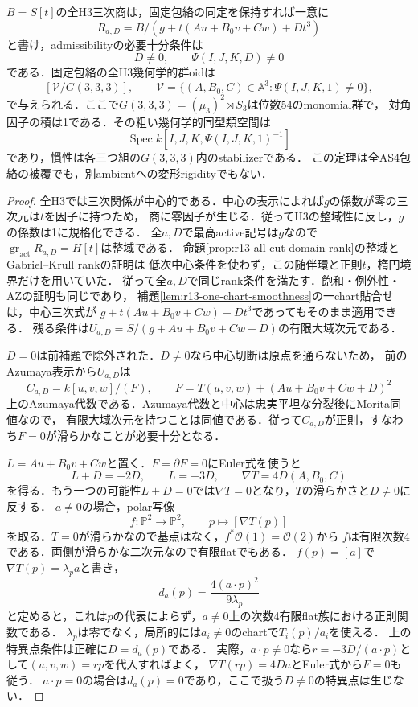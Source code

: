 \begin{theorem}
\label{thm:clifford-all-H3-cuts}
$B=S[t]$の全H3三次商は，固定包絡の同定を保持すれば一意に
\[
 R_{a,D}=B/(g+t(Au+B_0v+Cw)+Dt^3)
\]
と書け，admissibilityの必要十分条件は
\[
 D\ne0,\qquad \Psi(I,J,K,D)\ne0
\]
である．固定包絡の全H3幾何学的群oidは
\[
 [\mathcal V/G(3,3,3)],\qquad
 \mathcal V=\{(A,B_0,C)\in\mathbb A^3:\Psi(I,J,K,1)\ne0\},
\]
で与えられる．ここで$G(3,3,3)=(\mu_3)^2\rtimes S_3$は位数54のmonomial群で，
対角因子の積は1である．その粗い幾何学的同型類空間は
\[
 \operatorname{Spec}k[I,J,K,\Psi(I,J,K,1)^{-1}]
\]
であり，慣性は各三つ組の$G(3,3,3)$内のstabilizerである．
この定理は全AS4包絡の被覆でも，別ambientへの変形rigidityでもない．
\end{theorem}
\begin{proof}
全H3では三次関係が中心的である．中心の表示によれば$g$の係数が零の三次元は$t$を因子に持つため，
商に零因子が生じる．従ってH3の整域性に反し，$g$の係数は1に規格化できる．
全$a,D$で最高active記号は$g$なので
$\operatorname{gr}_{\mathrm{act}}R_{a,D}=H[t]$は整域である．
命題\ref{prop:r13-all-cut-domain-rank}の整域とGabriel--Krull rankの証明は
低次中心条件を使わず，この随伴環と正則$t$，楕円境界だけを用いていた．
従って全$a,D$で同じrank条件を満たす．飽和・例外性・AZの証明も同じであり，
補題\ref{lem:r13-one-chart-smoothness}の一chart貼合せは，中心三次式が
$g+t(Au+B_0v+Cw)+Dt^3$であってもそのまま適用できる．
残る条件は$U_{a,D}=S/(g+Au+B_0v+Cw+D)$の有限大域次元である．

$D=0$は前補題で除外された．$D\ne0$なら中心切断は原点を通らないため，
前のAzumaya表示から$U_{a,D}$は
\[
 C_{a,D}=k[u,v,w]/(F),\qquad
 F=T(u,v,w)+(Au+B_0v+Cw+D)^2
\]
上のAzumaya代数である．Azumaya代数と中心は忠実平坦な分裂後にMorita同値なので，
有限大域次元を持つことは同値である．従って$C_{a,D}$が正則，すなわち$F=0$が滑らかなことが必要十分となる．

$L=Au+B_0v+Cw$と置く．$F=\partial F=0$にEuler式を使うと
\[
 L+D=-2D,\qquad L=-3D,\qquad \nabla T=4D(A,B_0,C)
\]
を得る．もう一つの可能性$L+D=0$では$\nabla T=0$となり，$T$の滑らかさと$D\ne0$に反する．
$a\ne0$の場合，polar写像
\[
 f:\mathbb P^2\longrightarrow\mathbb P^2,\qquad p\longmapsto[\nabla T(p)]
\]
を取る．$T=0$が滑らかなので基点はなく，$f^*\mathcal O(1)=\mathcal O(2)$から
$f$は有限次数4である．両側が滑らかな二次元なので有限flatでもある．
$f(p)=[a]$で$\nabla T(p)=\lambda_p a$と書き，
\[
 d_a(p)=\frac{4(a\cdot p)^2}{9\lambda_p}
\]
と定めると，これは$p$の代表によらず，$a\ne0$上の次数4有限flat族における正則関数である．
$\lambda_p$は零でなく，局所的には$a_i\ne0$のchartで$T_i(p)/a_i$を使える．
上の特異点条件は正確に$D=d_a(p)$である．
実際，$a\cdot p\ne0$なら$r=-3D/(a\cdot p)$として$(u,v,w)=rp$を代入すればよく，
$\nabla T(rp)=4Da$とEuler式から$F=0$も従う．
$a\cdot p=0$の場合は$d_a(p)=0$であり，ここで扱う$D\ne0$の特異点は生じない．


\end{proof}
